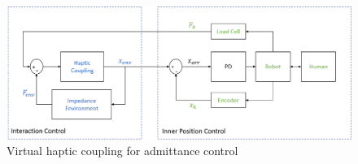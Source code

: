 \documentclass[12pt]{report}
\begin{document}
	
	
	
	


	
%


	


		
	\begin{figure}[h] 
		\centering
		\includegraphics[width=\linewidth]{control_diagram3}
		\caption{Virtual haptic coupling for admittance control}
		\label{fig:haptic_control}
	\end{figure} 
	
\end{document}
